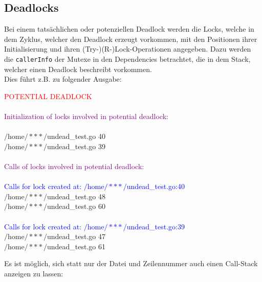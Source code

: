 \subsection{Deadlocks}
Bei einem tatsächlichen oder potenziellen Deadlock werden die Locks, welche in 
dem Zyklus, welcher den Deadlock erzeugt vorkommen, mit den Positionen
ihrer Initialisierung und ihren (Try-)(R-)Lock-Operationen angegeben. Dazu 
werden die \texttt{callerInfo} der Mutexe in den 
Dependencies betrachtet, die in dem Stack, welcher einen Deadlock beschreibt 
vorkommen.\\
Dies führt z.B. zu folgender Ausgabe:
\begin{mdframed}
\textcolor{red}{POTENTIAL DEADLOCK}\\
\\
\textcolor{purple}{Initialization of locks involved in potential deadlock:}\\
\\
$/$home$/***/$undead\_test.go 40\\
$/$home$/***/$undead\_test.go 39\\
\\
\textcolor{purple}{Calls of locks involved in potential deadlock:}\\
\\
\textcolor{blue}{Calls for lock created at: $/$home$/***/$undead\_test.go:40}\\
$/$home$/***/$undead\_test.go 48\\
$/$home$/***/$undead\_test.go 60\\
\\
\textcolor{blue}{Calls for lock created at: $/$home$/***/$undead\_test.go:39}\\
$/$home$/***/$undead\_test.go 47\\
$/$home$/***/$undead\_test.go 61
\end{mdframed}
Es ist möglich, sich statt nur der Datei und Zeilennummer auch einen 
Call-Stack anzeigen zu lassen:

